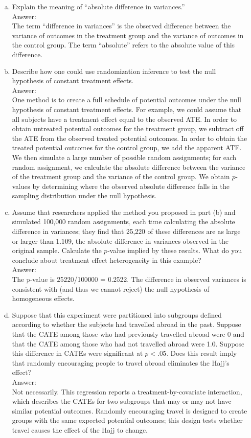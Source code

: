 \documentclass[11pt,notitlepage]{article}\usepackage[]{graphicx}\usepackage[]{color}
\begin{document}
\begin{enumerate}[a)]
\item Explain the meaning of ``absolute difference in variances.'' \\
Answer:\\
The term ``difference in variances'' is the observed difference between the variance of outcomes in the treatment group and the variance of outcomes in the control group. The term ``absolute'' refers to the absolute value of this difference.
\item Describe how one could use randomization inference to test the null hypothesis of constant treatment effects. \\
Answer:\\
One method is to create a full schedule of potential outcomes under the null hypothesis of constant treatment effects.  For example, we could assume that all subjects have a treatment effect equal to the observed ATE. In order to obtain untreated potential outcomes for the treatment group, we subtract off the ATE from the observed treated potential outcomes. In order to obtain the treated potential outcomes for the control group, we add the apparent ATE.  We then simulate a large number of possible random assignments; for each random assignment, we calculate the absolute difference between the variance of the treatment group and the variance of the control group. We obtain $p$-values by determining where the observed absolute difference falls in the sampling distribution under the null hypothesis.

\item Assume that researchers applied the method you proposed in part (b) and simulated 100,000 random assignments, each time calculating the absolute difference in variances; they find that 25,220 of these differences are as large or larger than 1.109, the absolute difference in variances observed in the original sample. Calculate the $p$-value implied by these results. What do you conclude about treatment effect heterogeneity in this example? \\
Answer:\\
The p-value is 25220/100000 = 0.2522.  The difference in observed variances is consistent with (and thus we cannot reject) the null hypothesis of homogeneous effects.

\item Suppose that this experiment were partitioned into subgroups defined according to whether the subjects had travelled abroad in the past. Suppose that the CATE among those who had previously travelled abroad were 0 and that the CATE among those who had not travelled abroad were 1.0. Suppose this difference in CATEs were significant at $p< .05$. Does this result imply that randomly encouraging people to travel abroad eliminates the Hajj's effect?\\
Answer:\\
Not necessarily.  This regression reports a treatment-by-covariate interaction, which describes the CATEs for two subgroups that may or may not have similar potential outcomes.  Randomly encouraging travel is designed to create groups with the same expected potential outcomes; this design tests whether travel causes the effect of the Hajj to change.


\end{enumerate}
\end{document}
